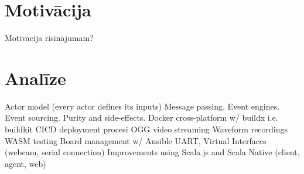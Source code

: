 \section{Motivācija}	
Motivācija risinājumam?

\section{Analīze}
Actor model (every actor defines its inputs)
Message passing.
Event engines.
Event sourcing.
Purity and side-effects.
Docker cross-platform w/ buildx i.e. buildkit
CICD deployment procesi
OGG video streaming
Waveform recordings
WASM testing
Board management w/ Ansible
UART, Virtual Interfaces (webcam, serial connection)
Improvements using Scala.js and Scala Native (client, agent, web)
